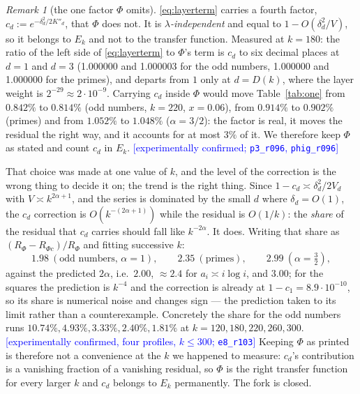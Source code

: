 \documentclass[11pt,a4paper]{article}
\theoremstyle{plain}
\theoremstyle{definition}
\theoremstyle{remark}
\newtheorem{remark}[theorem]{Remark}
\newcommand{\STATUS}[1]{\textcolor{blue}{\textsf{[#1]}}}
\begin{document}
\begin{remark}[the one factor $\Phi$ omits]\label{rem:cd}
\eqref{eq:layerterm} carries a fourth factor, $c_d:=e^{-\delta_d^{2}/2K''_d}$, that $\Phi$ does
not. It is \emph{$\lambda$-independent} and equal to $1-O(\delta_d^{2}/V)$, so it belongs to
$E_k$ and not to the transfer function. Measured at $k=180$: the ratio of the left side of
\eqref{eq:layerterm} to $\Phi$'s term is $c_d$ to six decimal places at $d=1$ and $d=3$
(1.000000 and 1.000003 for the odd numbers, 1.000000 and 1.000000 for the primes), and departs
from $1$ only at $d=D(k)$, where the layer weight is $2^{-29}\approx2\cdot10^{-9}$.
Carrying $c_d$ inside $\Phi$ would move Table~\ref{tab:one} from $0.842\%$ to $0.814\%$ (odd
numbers, $k=220$, $x=0.06$), from $0.914\%$ to $0.902\%$ (primes) and from $1.052\%$ to
$1.048\%$ ($\alpha=3/2$): the factor is real, it moves the residual the right way, and it
accounts for at most $3\%$ of it. We therefore keep $\Phi$ as stated and count $c_d$ in $E_k$.
\STATUS{experimentally confirmed; \texttt{p3\_r096}, \texttt{phig\_r096}}

That choice was made at one value of $k$, and the level of the correction is the wrong thing
to decide it on; the trend is the right thing. Since $1-c_d\asymp\delta_d^{2}/2V_d$ with
$V\asymp k^{2\alpha+1}$, and the series is dominated by the small $d$ where $\delta_d=O(1)$,
the $c_d$ correction is $O(k^{-(2\alpha+1)})$ while the residual is $O(1/k)$: the \emph{share}
of the residual that $c_d$ carries should fall like $k^{-2\alpha}$. It does. Writing that
share as $(R_\Phi-R_{\Phi c})/R_\Phi$ and fitting successive $k$:
\[
  1.98\ (\text{odd numbers, }\alpha=1),\qquad
  2.35\ (\text{primes}),\qquad
  2.99\ (\alpha=\tfrac32),
\]
against the predicted $2\alpha$, i.e.\ $2.00$, ${\approx}2.4$ for $a_i\asymp i\log i$, and
$3.00$; for the squares the prediction is $k^{-4}$ and the correction is already at
$1-c_1=8.9\cdot10^{-10}$, so its share is numerical noise and changes sign --- the prediction
taken to its limit rather than a counterexample. Concretely the share for the odd numbers runs
$10.74\%,4.93\%,3.33\%,2.40\%,1.81\%$ at $k=120,180,220,260,300$.
\STATUS{experimentally confirmed, four profiles, $k\le300$; \texttt{e8\_r103}}
Keeping $\Phi$ as printed is therefore not a convenience at the $k$ we happened to measure:
$c_d$'s contribution is a vanishing fraction of a vanishing residual, so $\Phi$ is the right
transfer function for every larger $k$ and $c_d$ belongs to $E_k$ permanently. The fork is
closed.
\end{remark}
\end{document}
